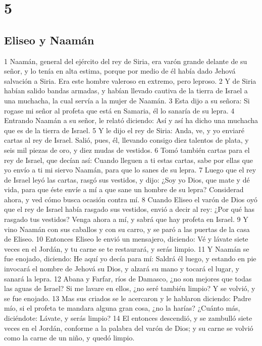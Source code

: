 \chapter{5}

\section*{Eliseo y Naamán}


1 Naamán, general del ejército del rey de Siria, era varón grande delante de su señor, y lo tenía en alta estima, porque por medio de él había dado Jehová salvación a Siria. Era este hombre valeroso en extremo, pero leproso.
2 Y de Siria habían salido bandas armadas, y habían llevado cautiva de la tierra de Israel a una muchacha, la cual servía a la mujer de Naamán.
3 Esta dijo a su señora: Si rogase mi señor al profeta que está en Samaria, él lo sanaría de su lepra.
4 Entrando Naamán a su señor, le relató diciendo: Así y así ha dicho una muchacha que es de la tierra de Israel.
5 Y le dijo el rey de Siria: Anda, ve, y yo enviaré cartas al rey de Israel. Salió, pues, él, llevando consigo diez talentos de plata,   y seis mil piezas de oro, y diez mudas de vestidos.
6 Tomó también cartas para el rey de Israel, que decían así: Cuando lleguen a ti estas cartas, sabe por ellas que yo envío a ti mi siervo Naamán, para que lo sanes de su lepra.
7 Luego que el rey de Israel leyó las cartas, rasgó sus vestidos, y dijo: ¿Soy yo Dios, que mate y dé vida, para que éste envíe a mí a que sane un hombre de su lepra? Considerad ahora, y ved cómo busca ocasión contra mí.
8 Cuando Eliseo el varón de Dios oyó que el rey de Israel había rasgado sus vestidos, envió a decir al rey: ¿Por qué has rasgado tus vestidos? Venga ahora a mí, y sabrá que hay profeta en Israel.
9 Y vino Naamán con sus caballos y con su carro, y se paró a las puertas de la casa de Eliseo.
10 Entonces Eliseo le envió un mensajero, diciendo: Vé y lávate siete veces en el Jordán, y tu carne se te restaurará, y serás limpio.
11 Y Naamán se fue enojado, diciendo: He aquí yo decía para mí: Saldrá él luego, y estando en pie invocará el nombre de Jehová su Dios, y alzará su mano y tocará el lugar, y sanará la lepra.
12 Abana y Farfar, ríos de Damasco, ¿no son mejores que todas las aguas de Israel? Si me lavare en ellos, ¿no seré también limpio? Y se volvió, y se fue enojado.
13 Mas sus criados se le acercaron y le hablaron diciendo: Padre mío, si el profeta te mandara alguna gran cosa, ¿no la harías? ¿Cuánto más, diciéndote: Lávate, y serás limpio?
14 El entonces descendió, y se zambulló siete veces en el Jordán, conforme a la palabra del varón de Dios; y su carne se volvió como la carne de un niño, y quedó limpio.
